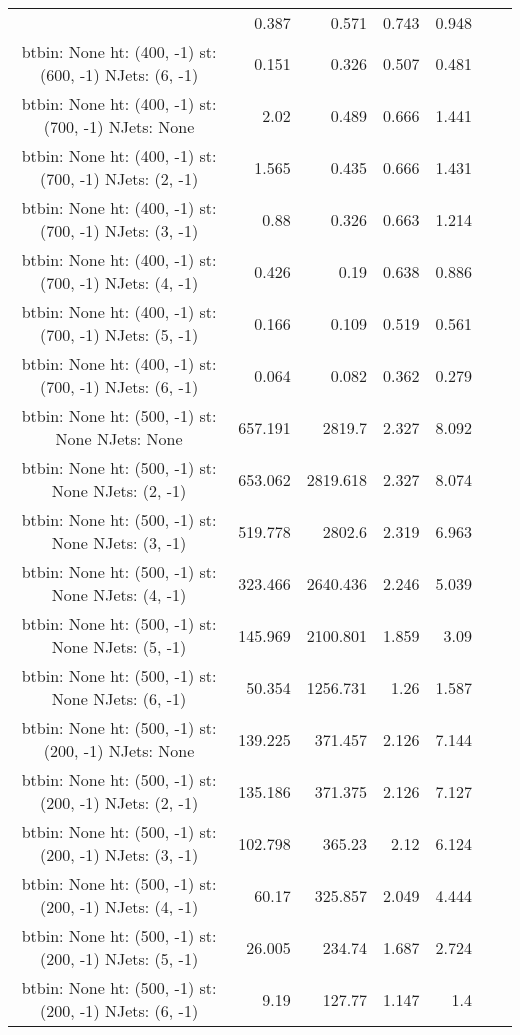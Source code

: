 \documentclass[12pt]{paper}
\begin{document}
\begin{landscape}
\begin{longtable}{c|r|r|r|r|r|r}
 & 0.387 & 0.571 & 0.743 & 0.948\\
btbin:  None ht:  (400, -1) st:  (600, -1) NJets:  (6, -1)
 & 0.151 & 0.326 & 0.507 & 0.481\\
btbin:  None ht:  (400, -1) st:  (700, -1) NJets:  None
 & 2.02 & 0.489 & 0.666 & 1.441\\
btbin:  None ht:  (400, -1) st:  (700, -1) NJets:  (2, -1)
 & 1.565 & 0.435 & 0.666 & 1.431\\
btbin:  None ht:  (400, -1) st:  (700, -1) NJets:  (3, -1)
 & 0.88 & 0.326 & 0.663 & 1.214\\
btbin:  None ht:  (400, -1) st:  (700, -1) NJets:  (4, -1)
 & 0.426 & 0.19 & 0.638 & 0.886\\
btbin:  None ht:  (400, -1) st:  (700, -1) NJets:  (5, -1)
 & 0.166 & 0.109 & 0.519 & 0.561\\
btbin:  None ht:  (400, -1) st:  (700, -1) NJets:  (6, -1)
 & 0.064 & 0.082 & 0.362 & 0.279\\
btbin:  None ht:  (500, -1) st:  None NJets:  None
 & 657.191 & 2819.7 & 2.327 & 8.092\\
btbin:  None ht:  (500, -1) st:  None NJets:  (2, -1)
 & 653.062 & 2819.618 & 2.327 & 8.074\\
btbin:  None ht:  (500, -1) st:  None NJets:  (3, -1)
 & 519.778 & 2802.6 & 2.319 & 6.963\\
btbin:  None ht:  (500, -1) st:  None NJets:  (4, -1)
 & 323.466 & 2640.436 & 2.246 & 5.039\\
btbin:  None ht:  (500, -1) st:  None NJets:  (5, -1)
 & 145.969 & 2100.801 & 1.859 & 3.09\\
btbin:  None ht:  (500, -1) st:  None NJets:  (6, -1)
 & 50.354 & 1256.731 & 1.26 & 1.587\\
btbin:  None ht:  (500, -1) st:  (200, -1) NJets:  None
 & 139.225 & 371.457 & 2.126 & 7.144\\
btbin:  None ht:  (500, -1) st:  (200, -1) NJets:  (2, -1)
 & 135.186 & 371.375 & 2.126 & 7.127\\
btbin:  None ht:  (500, -1) st:  (200, -1) NJets:  (3, -1)
 & 102.798 & 365.23 & 2.12 & 6.124\\
btbin:  None ht:  (500, -1) st:  (200, -1) NJets:  (4, -1)
 & 60.17 & 325.857 & 2.049 & 4.444\\
btbin:  None ht:  (500, -1) st:  (200, -1) NJets:  (5, -1)
 & 26.005 & 234.74 & 1.687 & 2.724\\
btbin:  None ht:  (500, -1) st:  (200, -1) NJets:  (6, -1)
 & 9.19 & 127.77 & 1.147 & 1.4\\

\end{longtable}
\end{landscape}
\end{document}
